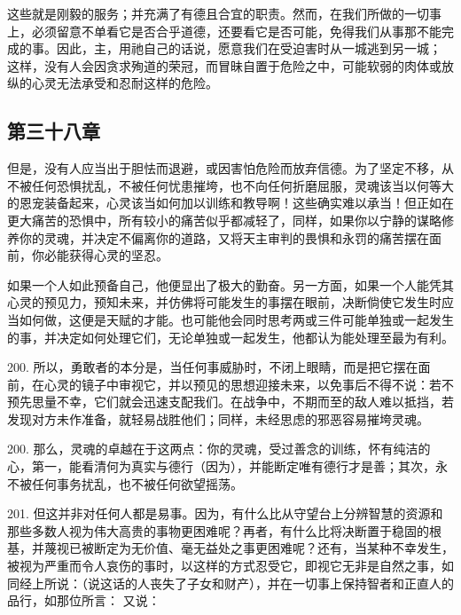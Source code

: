 这些就是刚毅的服务；并充满了有德且合宜的职责。然而，在我们所做的一切事上，必须留意不单看它是否合乎道德，还要看它是否可能，免得我们从事那不能完成的事。因此，主，用祂自己的话说，愿意我们在受迫害时从一城逃到另一城； 这样，没有人会因贪求殉道的荣冠，而冒昧自置于危险之中，可能软弱的肉体或放纵的心灵无法承受和忍耐这样的危险。\par


\subsection{第三十八章}

\par

但是，没有人应当出于胆怯而退避，或因害怕危险而放弃信德。为了坚定不移，从不被任何恐惧扰乱，不被任何忧患摧垮，也不向任何折磨屈服，灵魂该当以何等大的恩宠装备起来，心灵该当如何加以训练和教导啊！这些确实难以承当！但正如在更大痛苦的恐惧中，所有较小的痛苦似乎都减轻了，同样，如果你以宁静的谋略修养你的灵魂，并决定不偏离你的道路，又将天主审判的畏惧和永罚的痛苦摆在面前，你必能获得心灵的坚忍。\par

如果一个人如此预备自己，他便显出了极大的勤奋。另一方面，如果一个人能凭其心灵的预见力，预知未来，并仿佛将可能发生的事摆在眼前，决断倘使它发生时应当如何做，这便是天赋的才能。也可能他会同时思考两或三件可能单独或一起发生的事，并决定如何处理它们，无论单独或一起发生，他都认为能处理至最为有利。\par

200. 所以，勇敢者的本分是，当任何事威胁时，不闭上眼睛，而是把它摆在面前，在心灵的镜子中审视它，并以预见的思想迎接未来，以免事后不得不说：若不预先思量不幸，它们就会迅速支配我们。在战争中，不期而至的敌人难以抵挡，若发现对方未作准备，就轻易战胜他们；同样，未经思虑的邪恶容易摧垮灵魂。\par

200. 那么，灵魂的卓越在于这两点：你的灵魂，受过善念的训练，怀有纯洁的心，第一，能看清何为真实与德行（因为），并能断定唯有德行才是善；其次，永不被任何事务扰乱，也不被任何欲望摇荡。\par

201. 但这并非对任何人都是易事。因为，有什么比从守望台上分辨智慧的资源和那些多数人视为伟大高贵的事物更困难呢？再者，有什么比将决断置于稳固的根基，并蔑视已被断定为无价值、毫无益处之事更困难呢？还有，当某种不幸发生，被视为严重而令人哀伤的事时，以这样的方式忍受它，即视它无非是自然之事，如同经上所说：（说这话的人丧失了子女和财产），并在一切事上保持智者和正直人的品行，如那位所言： 又说：\par

